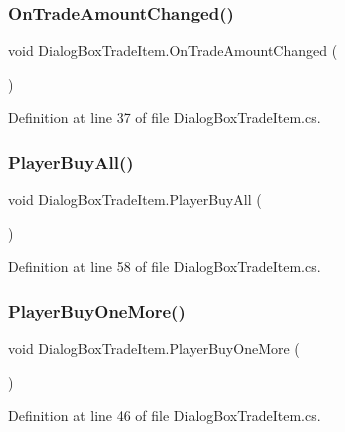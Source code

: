 \subsubsection{\texorpdfstring{On\+Trade\+Amount\+Changed()}{OnTradeAmountChanged()}}
{\footnotesize\ttfamily void Dialog\+Box\+Trade\+Item.\+On\+Trade\+Amount\+Changed (\begin{DoxyParamCaption}{ }\end{DoxyParamCaption})}



Definition at line 37 of file Dialog\+Box\+Trade\+Item.\+cs.

\mbox{\label{class_dialog_box_trade_item_ad4915a87cdc17c0dc61178a7539d1386}} 
\subsubsection{\texorpdfstring{Player\+Buy\+All()}{PlayerBuyAll()}}
{\footnotesize\ttfamily void Dialog\+Box\+Trade\+Item.\+Player\+Buy\+All (\begin{DoxyParamCaption}{ }\end{DoxyParamCaption})}



Definition at line 58 of file Dialog\+Box\+Trade\+Item.\+cs.

\mbox{\label{class_dialog_box_trade_item_aa31448004e07ec712f1857e93becfce9}} 
\subsubsection{\texorpdfstring{Player\+Buy\+One\+More()}{PlayerBuyOneMore()}}
{\footnotesize\ttfamily void Dialog\+Box\+Trade\+Item.\+Player\+Buy\+One\+More (\begin{DoxyParamCaption}{ }\end{DoxyParamCaption})}



Definition at line 46 of file Dialog\+Box\+Trade\+Item.\+cs.

